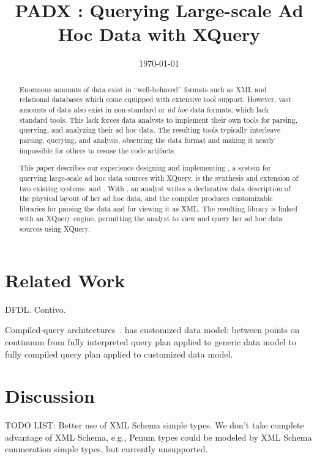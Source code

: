 \documentclass[nocopyrightspace]{sigplanconf}
\title{PADX : Querying Large-scale Ad Hoc Data with XQuery}
\date{\today}
\begin{document}
\maketitle
\begin{abstract}
Enormous amounts of data exist in ``well-behaved'' formats
such as XML and relational databases which come equipped with
extensive tool support.  However,  vast amounts of data also exist
in non-standard or \textit{ad hoc} data formats, which lack standard
tools. This lack forces data analysts to implement their own tools for
parsing, querying, and analyzing their ad hoc data.  The 
resulting tools typically interleave parsing, querying, and analysis,
obscuring the data format and making it nearly impossible for others
to resuse the code artifacts.

This paper describes our experience designing and implementing
\padx{}, a system for querying large-scale ad hoc data sources with
XQuery.  \padx{} is the synthesis and extension of two existing
systems: \pads{} and \Galax{}. With \padx{}, an analyst writes a
declarative data description of the physical layout of her ad hoc
data, and the \pads{} compiler produces customizable libraries for
parsing the data and for viewing it as XML.  The resulting library is
linked with an XQuery engine, permitting the analyst to view and query
her ad hoc data sources using XQuery.
\end{abstract}







\section{Related Work}
\label{section:relatedwork}

DFDL. Contivo.  

Compiled-query architectures~\cite{daytona}.  \padx{} has customized
data model: between points on continuum from fully interpreted query
plan applied to generic data model to fully compiled query plan
applied to customized data model.

\section{Discussion}
\label{section:future}

TODO LIST: Better use of XML Schema simple types.
We don't take complete advantage of XML Schema, e.g., Penum types
could be modeled by XML Schema enumeration simple types, but currently
unsupported.
\end{document}
